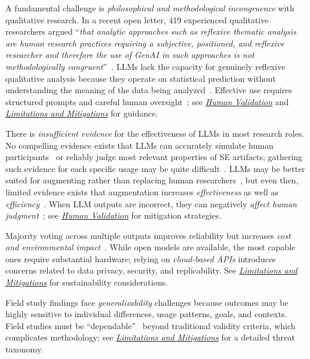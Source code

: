 \documentclass[smallextended]{svjour3}
\newcommand*{\enq}[1]{\enquote{{\itshape#1}}}
\newcommand{\humanvalidation}{\hyperref[sec:use-human-validation-for-llm-outputs]{\emph{Human Validation}}\xspace}
\newcommand{\limitationsmitigations}{\hyperref[sec:report-limitations-and-mitigations]{\emph{Limitations and Mitigations}}\xspace}
\newcommand{\humanvalidation}{\href{/guidelines\#use-human-validation-for-llm-outputs}{\emph{Human Validation}}\xspace}
\newcommand{\limitationsmitigations}{\href{/guidelines\#report-limitations-and-mitigations}{\emph{Limitations and Mitigations}}\xspace}
\begin{document}
A fundamental challenge is \emph{philosophical and methodological incongruence} with qualitative research. In a recent open letter, 419 experienced qualitative researchers argued \enq{that analytic approaches such as reflexive thematic analysis are human research practices requiring a subjective, positioned, and reflexive researcher and therefore the use of GenAI in such approaches is not methodologically congruent}~\cite{jowsey2025reject}. LLMs lack the capacity for genuinely reflexive qualitative analysis because they operate on statistical prediction without understanding the meaning of the data being analyzed~\cite{jowsey2025reject, DBLP:journals/corr/abs-2306-13298, DBLP:journals/corr/abs-2510-18456}. Effective use requires structured prompts and careful human oversight~\cite{DBLP:conf/wsese/BarrosANKKNB25}; see \humanvalidation and \limitationsmitigations for guidance.

There is \emph{insufficient evidence} for the effectiveness of LLMs in most research roles. No compelling evidence exists that LLMs can accurately simulate human participants~\cite{DBLP:journals/corr/abs-2508-06950} or reliably judge most relevant properties of SE artifacts; gathering such evidence for each specific usage may be quite difficult~\cite{DBLP:journals/ais/HardingDLL24}. LLMs may be better suited for augmenting rather than replacing human researchers~\cite{DBLP:conf/emnlp/WangLXZZ21, DBLP:conf/chi/HeHDRH24}, but even then, limited evidence exists that augmentation increases \emph{effectiveness} as well as \emph{efficiency}~\cite{DBLP:journals/corr/abs-2508-06950}. When LLM outputs are incorrect, they can negatively \emph{affect human judgment}~\cite{DBLP:conf/www/HuangKA23a, panHumanCenteredDesignRecommendations2024}; see \humanvalidation for mitigation strategies.

Majority voting across multiple outputs improves reliability but increases \emph{cost and environmental impact}~\cite{DBLP:journals/corr/abs-2304-11085, DBLP:conf/emnlp/WangLXZZ21}. While open models are available, the most capable ones require substantial hardware; relying on \emph{cloud-based APIs} introduces concerns related to data privacy, security, and replicability. See \limitationsmitigations for sustainability considerations.

Field study findings face \emph{generalizability} challenges because outcomes may be highly sensitive to individual differences, usage patterns, goals, and contexts. Field studies must be ``dependable''~\cite{Sullivan2011-ub} beyond traditional validity criteria, which complicates methodology; see \limitationsmitigations for a detailed threat taxonomy.
 
\end{document}

